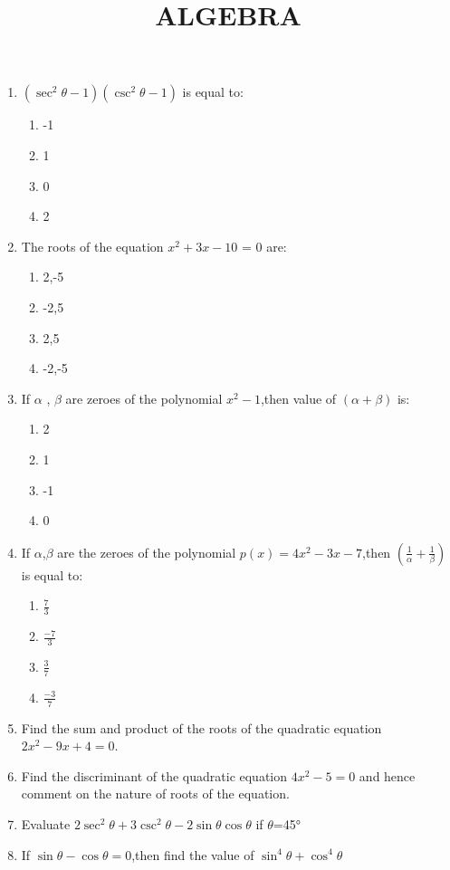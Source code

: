 \documentclass{article}
\begin{document}
\title{ALGEBRA}
\date{}
\maketitle
\begin{enumerate}
     \item $\left(\sec^2{\theta} - 1\right) \left(\csc^2{\theta} - 1\right)$ is equal to:
    \begin{enumerate}
        \item -1
        \item  1
        \item  0
        \item  2
    \end{enumerate}
    \item The roots of the equation $x^2 + 3x - 10$ = 0 are:
    \begin{enumerate}
        \item 2,-5
        \item -2,5
        \item 2,5
        \item -2,-5
    \end{enumerate}
    \item If $\alpha$ , $\beta$ are zeroes of the polynomial $x^2-1$,then value of $\left(\alpha+\beta\right)$ is:
    \begin{enumerate}
        \item 2
        \item 1
        \item -1
        \item 0
    \end{enumerate}
   \item  If $\alpha$,$\beta$ are the zeroes of the polynomial $p(x)=4x^2 - 3x -7$,then $\left(\frac{1}{\alpha}+\frac{1}{\beta}\right)$ is equal to:
   \begin{enumerate}
       \item $\frac{7}{3}$
       \item $\frac{-7}{3}$
       \item $\frac{3}{7}$
       \item $\frac{-3}{7}$
   \end{enumerate}
   \item  Find the sum and product of the roots of the quadratic equation $2x^2-9x+4=0$.
   \item Find the discriminant of the quadratic equation $4x^2-5=0$ and hence comment on the nature of roots of the equation.
   \item Evaluate $2\sec^2\theta+3\csc^2\theta-2\sin\theta\cos\theta$ if $\theta$=45\si{\degree}
   \item If $\sin\theta-\cos\theta=0$,then find the value of $\sin^4\theta+\cos^4\theta$
\end{enumerate}
\end{document}

